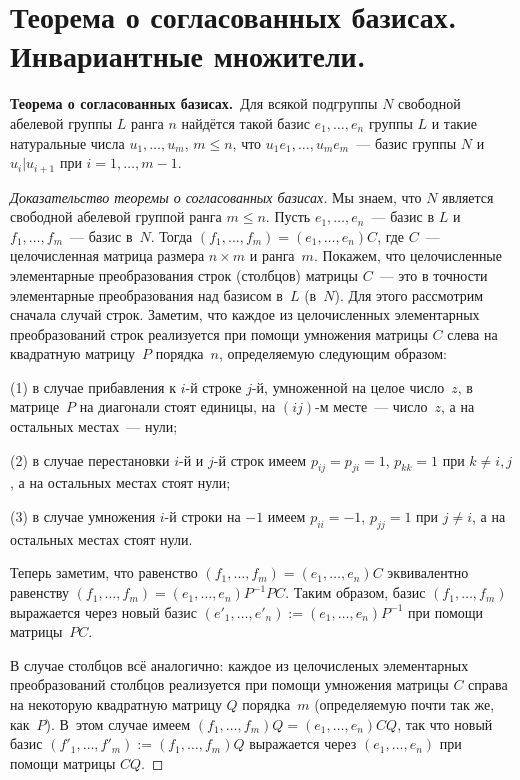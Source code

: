 \documentclass[a4paper, 12pt]{article}
\theoremstyle{definition}
\theoremstyle{remark}
\begin{document}
\section{Теорема о согласованных базисах. Инвариантные множители.}

{\bf Теорема о согласованных базисах.}\ Для всякой подгруппы $N$
свободной абелевой группы $L$ ранга $n$ найдётся такой базис $e_1,
\ldots, e_n$ группы $L$ и такие натуральные числа $u_1, \ldots,
u_m$, $m \leqslant n$, что $u_1 e_1, \ldots, u_m e_m$~--- базис
группы $N$ и $u_i | u_{i+1}$ при $i = 1, \ldots, m-1$.

\begin{proof}[Доказательство теоремы о согласованных базисах]
Мы знаем, что $N$ является свободной абелевой группой ранга $m
\leqslant n$. Пусть $e_1, \ldots, e_n$~--- базис в $L$ и $f_1,
\ldots, f_m$~--- базис в~$N$. Тогда $(f_1, \ldots, f_m) = (e_1,
\ldots, e_n)C$, где $C$~--- целочисленная матрица размера $n \times
m$ и ранга~$m$. Покажем, что целочисленные элементарные
преобразования строк (столбцов) матрицы $C$~--- это в точности
элементарные преобразования над базисом в~$L$ (в~$N$). Для этого
рассмотрим сначала случай строк. Заметим, что каждое из
целочисленных элементарных преобразований строк реализуется при
помощи умножения матрицы $C$ слева на квадратную матрицу~$P$
порядка~$n$, определяемую следующим образом:

(1) в случае прибавления к $i$-й строке $j$-й, умноженной на целое
число~$z$, в матрице~$P$ на диагонали стоят единицы, на $(ij)$-м
месте~--- число~$z$, а на остальных местах~--- нули;

(2) в случае перестановки $i$-й и $j$-й строк имеем $p_{ij} = p_{ji}
= 1$, $p_{kk} = 1$ при $k \ne i,j$, а на остальных местах стоят
нули;

(3) в случае умножения $i$-й строки на $-1$ имеем $p_{ii} = -1$,
$p_{jj} = 1$ при $j \ne i$, а на остальных местах стоят нули.

Теперь заметим, что равенство $(f_1, \ldots, f_m) = (e_1, \ldots,
e_n)C$ эквивалентно равенству $(f_1, \ldots, f_m) = (e_1, \ldots,
e_n)P^{-1} PC$. Таким образом, базис $(f_1, \ldots, f_m)$ выражается
через новый базис $(e'_1, \ldots, e'_n) := (e_1, \ldots, e_n)P^{-1}$
при помощи матрицы~$PC$.

В случае столбцов всё аналогично: каждое из целочисленых
элементарных преобразований столбцов реализуется при помощи
умножения матрицы $C$ справа на некоторую квадратную матрицу $Q$
порядка~$m$ (определяемую почти так же, как~$P$). В~этом случае
имеем $(f_1, \ldots, f_m)Q = (e_1, \ldots, e_n)CQ$, так что новый
базис $(f'_1, \ldots, f'_m) := (f_1, \ldots, f_m)Q$ выражается через
$(e_1, \ldots, e_n)$ при помощи матрицы $CQ$.


\end{proof}
\end{document}
